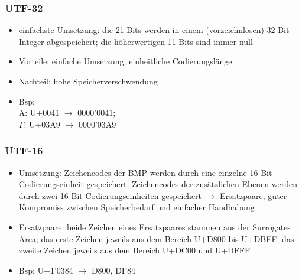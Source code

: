 \documentclass[a4paper,10pt]{article}
\begin{document}
\subsubsection{UTF-32}
\begin{itemize}
\item einfachste Umsetzung: die 21 Bits werden in einem (vorzeichnlosen) 32-Bit-Integer abgespeichert; die h\"oherwertigen 11 Bits sind immer null
\item Vorteile: einfache Umsetzung; einheitliche Codierungsl\"ange
\item Nachteil: hohe Speicherverschwendung
\item Bsp: \\ A: U+0041 $\to$ 0000'0041; \\ $\Gamma$: U+03A9 $\to$ 0000'03A9
\end{itemize}

\subsubsection{UTF-16}
\begin{itemize}
\item Umsetzung: Zeichencodes der BMP werden durch eine einzelne 16-Bit Codierungseinheit gespeichert; Zeichencodes der zus\"atzlichen Ebenen werden durch zwei 16-Bit Codierungseinheiten gespeichert $\to$ Ersatzpaare; guter Kompromiss zwischen Speicherbedarf und einfacher Handhabung
\item Ersatzpaare: beide Zeichen eines Ersatzpaares stammen aus der Surrogates Area; das erste Zeichen jeweils aus dem Bereich U+D800 bis U+DBFF; das zweite Zeichen jeweils aus dem Bereich U+DC00 und U+DFFF
\item Bsp: U+1'0384 $\to$ D800, DF84
\end{itemize}
\end{document}
